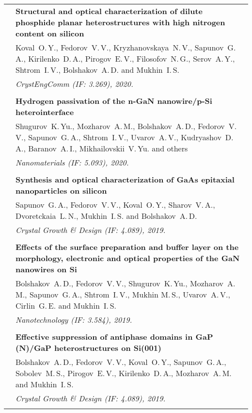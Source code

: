 \documentclass[letterpaper, 11pt]{article}
\begin{document}
\begin{longtable}{p{1.3in}p{4.8in}}
        & \textbf{Structural and optical characterization of dilute phosphide
        planar heterostructures with high nitrogen content on silicon} \\
        & Koval~O.\,Y., Fedorov~V.\,V., Kryzhanovskaya~N.\,V., Sapunov~G.\,A.,
        Kirilenko~D.\,A., Pirogov~E.\,V., Filosofov~N.\,G., Serov~A.\,Y.,
        Shtrom~I.\,V., Bolshakov~A.\,D. and Mukhin~I.\,S. \\
        & \textit{CrystEngComm (IF: 3.269), 2020.}\\
		& \\
		
        & \textbf{Hydrogen passivation of the n-GaN nanowire/p-Si
        heterointerface} \\
        & Shugurov~K.\,Yu., Mozharov~A.\,M., Bolshakov~A.\,D., Fedorov~V.\,V.,
        Sapunov~G.\,A., Shtrom~I.\,V., Uvarov~A.\,V., Kudryashov~D.\,A.,
        Baranov~A.\,I., Mikhailovskii~V.\,Yu. and others \\
        & \textit{Nanomaterials (IF: 5.093), 2020.}\\
		& \\
		
        & \textbf{Synthesis and optical characterization of GaAs epitaxial
        nanoparticles on silicon} \\
        & Sapunov~G.\,A., Fedorov~V.\,V., Koval~O.\,Y., Sharov~V.\,A.,
        Dvoretckaia~L.\,N., Mukhin~I.\,S. and Bolshakov~A.\,D. \\
        & \textit{Crystal Growth \& Design (IF: 4.089), 2019.}\\
		& \\
		
        & \textbf{Effects of the surface preparation and buffer layer on the
        morphology, electronic and optical properties of the GaN nanowires on
        Si} \\
        & Bolshakov~A.\,D., Fedorov~V.\,V., Shugurov~K.\,Yu., Mozharov~A.\,M.,
        Sapunov~G.\,A., Shtrom~I.\,V., Mukhin M.\,S., Uvarov~A.\,V.,
        Cirlin~G.\,E. and Mukhin~I.\,S. \\
        & \textit{Nanotechnology (IF: 3.584), 2019.}\\
		& \\
		
        & \textbf{Effective suppression of antiphase domains in GaP (N)/GaP
        heterostructures on Si(001)} \\
        & Bolshakov~A.\,D., Fedorov~V.\,V., Koval~O.\,Y., Sapunov~G.\,A.,
        Sobolev~M.\,S., Pirogov~E.\,V., Kirilenko~D.\,A., Mozharov~A.\,M. and
        Mukhin~I.\,S. \\
        & \textit{Crystal Growth \& Design (IF: 4.089), 2019.}\\
		& \\
		

\end{longtable}
\end{document}
